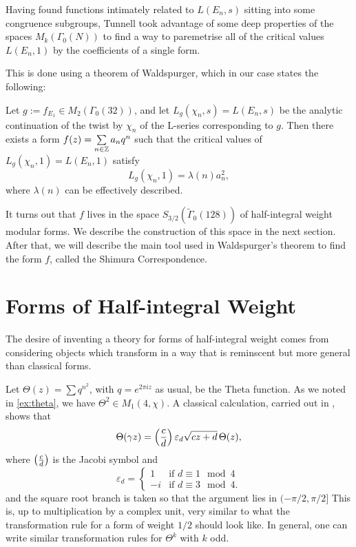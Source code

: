 \documentclass[12pt, a4paper]{report}
\begin{document}
Having found functions intimately related to $L(E_n,s)$ sitting into some
congruence subgroups, Tunnell took advantage of some deep properties of the
spaces $M_k(\Gamma_0(N))$ to find a way to paremetrise all of the critical
values $L(E_n,1)$ by the coefficients of a single form.

This is done using a theorem of Waldspurger, which in our case states the
following:

Let $g := f_{E_1} \in M_2(\Gamma_0(32))$, and let $L_g(\chi_n, s) = L(E_n,s)$
be the analytic continuation of the twist by $\chi_n$ of the L-series
corresponding to $g$. 
Then there exists a form $f(z) = \sum\limits_{n \in {\mathbb Z}} a_nq^n$ 
such that the critical values of
$L_g(\chi_n,1) = L(E_n,1)$ satisfy
\[L_g(\chi_n,1) = \lambda(n) a_n^2,\]
where $\lambda(n)$ can be effectively described.

It turns out that $f$ lives in the space $S_{3/2}(\tilde{\Gamma}_0(128))$ of
half-integral weight modular forms. We describe the construction of this space
in the next section. After that, we will describe the main tool used in
Waldspurger's theorem to find the form $f$, called the Shimura Correspondence.

\section{Forms of Half-integral Weight}

The desire of inventing a theory for forms of half-integral weight comes from
considering objects which transform in a way that is reminscent but more general
than classical forms.

\begin{example}
  Let $\Theta(z) = \sum q^{n^2}$, with $q = e^{2 \pi i z}$ as usual, be the
  Theta function.
  As we noted in
  \ref{ex:theta}, we have $\Theta^2 \in M_1(4,\chi)$. A classical calculation,
  carried out in \cite[Chapter III-4, Pages 148-149]{koblitz}, shows that
  \[\Theta(\gamma z) = \left(\frac{c}{d}\right) \varepsilon_d \sqrt{cz+d} \,  \Theta(z),\]
  where $\left(\frac{c}{d}\right)$ is the Jacobi symbol and
  \[\varepsilon_d =
    \begin{cases}
      1 & \text{if } d \equiv 1 \mod{4} \\ 
      -i & \text{if } d \equiv 3 \mod{4}.
    \end{cases}
  \]
  and the square root branch is taken so that the argument lies in $(-\pi/2,
  \pi/2 ]$
  This is, up to multiplication by a complex unit, very similar to what the
  transformation rule for a form of weight $1/2$ should look like.
  In general, one can write similar
  transformation rules for $\Theta^k$ with $k$ odd. 
\end{example}
\end{document}
